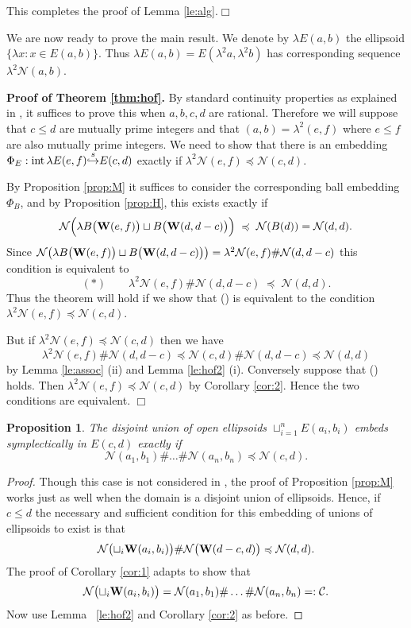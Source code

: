 \documentclass[11pt]{amsart}
\newcommand{\labell}[1] {\label{#1}}
\newcommand{\1}{{{\mathchoice {\rm 1\mskip-4mu l} {\rm 1\mskip-4mu l}
{\rm 1\mskip-4.5mu l} {\rm 1\mskip-5mu l}}}}
\newcommand{\bW} {{\bf W}}
\newcommand{\intt}{{\rm int\,}}
\newcommand{\la}{{\lambda}}
\newcommand{\Cc}{{\mathcal C}}
\newcommand{\Nn}{{\mathcal N}}
\newcommand{\QED}{{\hfill $\Box$\MS}}
\newcommand{\se} {{\stackrel{s}\hookrightarrow}}
\newtheorem{prop}[theorem]{Proposition}
\numberwithin{figure}{section}
\numberwithin{equation}{section}
\newcommand{\MS}{{\medskip}}
\newcommand{\NI}{{\noindent}}
\begin{document}
This completes the proof of Lemma \ref{le:alg}.\QED

We are now ready to prove the main result.
We denote by $\la E(a,b)$ the ellipsoid $\{\la x:x\in E(a,b)\}$.  Thus $\la E(a,b) = E(\la^2 a, \la^2 b)$ has  corresponding sequence $\la^2\Nn(a,b)$.
\MS

\NI {\bf Proof of Theorem \ref{thm:hof}.} 
  By standard continuity properties as explained in
\cite[Cor.~1,5]{M}, 
it suffices to prove this when $a,b,c,d$ are rational.
Therefore we will suppose that $c\le d$ are mutually prime integers
and that $(a,b) = \la^2 (e,f)$ where $e\le f$ are also mutually prime integers. 
We need to show that there is
 an embedding 
$\Phi_E: \intt \la E(e,f)\se E(c,d)$ exactly if $\la^2\Nn(e,f)\preccurlyeq \Nn(c,d)$.

By Proposition \ref{prop:M} 
it suffices to consider the corresponding ball embedding $\Phi_B$, and by 
 Proposition \ref{prop:H}, this  exists exactly if 
$$
\Nn\Bigl( \la B\bigl(\bW(e,f)\bigr) \sqcup  B\bigl(\bW(d,d-c)\bigr)\Bigr)\;\preccurlyeq\; \Nn(B(d)) = \Nn(d,d).
$$
Since $\Nn\bigl( \la B\bigl(\bW(e,f)\bigr) \sqcup  B\bigl(\bW(d,d-c)\bigr)\bigr) =
\la^2 \Nn(e,f)\# \Nn(d,d-c)$  this condition is equivalent to
$$
(*)\qquad\la^2 \Nn(e,f)\# \Nn(d,d-c) \;\preccurlyeq\; \Nn(d,d).
$$
Thus the theorem will hold if we show that (\textasteriskcentered) is equivalent to the condition
$\la^2 \Nn(e,f)\preccurlyeq \Nn(c,d)$.

But if $\la^2 \Nn(e,f)\preccurlyeq \Nn(c,d)$ then  we have
$$
\la^2 \Nn(e,f)\# \Nn(d,d-c) \preccurlyeq
\Nn(c,d)\# \Nn(d,d-c)  \preccurlyeq \Nn(d,d)
$$
by Lemma \ref{le:assoc} (ii) and Lemma \ref{le:hof2} (i).
Conversely suppose that (\textasteriskcentered) holds. 
Then $\la^2 \Nn(e,f) \preccurlyeq\Nn(c,d)$ by Corollary \ref{cor:2}.
    Hence the two conditions are equivalent.
\QED

\begin{prop}\labell{prop:many}  The disjoint union of open ellipsoids 
$\sqcup_{i=1}^nE(a_i,b_i)$ embeds symplectically in $E(c,d)$ exactly if
$$
\Nn(a_1,b_1)\#\dots\#\Nn(a_n,b_n)\preccurlyeq \Nn(c,d).
$$ 
\end{prop}  
\begin{proof} Though this case is not considered in \cite{M}, the proof of Proposition \ref{prop:M}  works just as well when the domain is a disjoint union of ellipsoids.  Hence, if $c\le d$
the necessary and sufficient condition for this embedding of unions of ellipsoids to exist is that
$$
\Nn\bigl(\sqcup_i \bW(a_i,b_i)\bigr)\# \Nn\bigl(\bW(d-c,d)\bigr)
\preccurlyeq  \Nn(d,d).
$$
The proof of Corollary \ref{cor:1} adapts to show that 
$$
\Nn\bigl(\sqcup_i \bW(a_i,b_i)\bigr) = 
\Nn(a_1,b_1)\#\dots\#\Nn(a_n,b_n) = :\Cc.
$$
Now use Lemma ~\ref{le:hof2} and Corollary \ref{cor:2} as before. 
\end{proof}  
\end{document}
